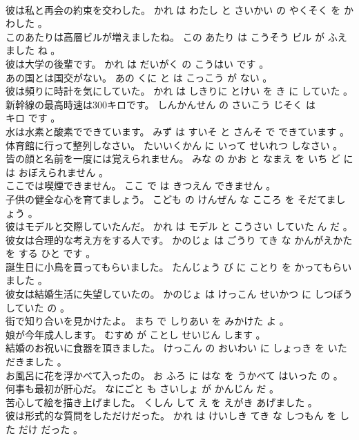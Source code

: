 \documentclass[8pt]{extreport}
\begin{document}
\begin{CJK}{UTF8}{min}
\\	彼は私と再会の約束を交わした。	かれ は わたし と さいかい の やくそく を かわした 。 
\\	このあたりは高層ビルが増えましたね。	この あたり は こうそう ビル が ふえました ね 。 
\\	彼は大学の後輩です。	かれ は だいがく の こうはい です 。 
\\	あの国とは国交がない。	あの くに と は こっこう が ない 。 
\\	彼は頻りに時計を気にしていた。	かれ は しきりに とけい を き に していた 。 
\\	新幹線の最高時速は300キロです。	しんかんせん の さいこう じそく は 
\\	キロ です 。 
\\	水は水素と酸素でできています。	みず は すいそ と さんそ で できています 。 
\\	体育館に行って整列しなさい。	たいいくかん に いって せいれつ しなさい 。 
\\	皆の顔と名前を一度には覚えられません。	みな の かお と なまえ を いち ど に は おぼえられません 。 
\\	ここでは喫煙できません。	ここ で は きつえん できません 。 
\\	子供の健全な心を育てましょう。	こども の けんぜん な こころ を そだてましょう 。 
\\	彼はモデルと交際していたんだ。	かれ は モデル と こうさい していた ん だ 。 
\\	彼女は合理的な考え方をする人です。	かのじょ は ごうり てき な かんがえかた を する ひと です 。 
\\	誕生日に小鳥を買ってもらいました。	たんじょう び に ことり を かってもらいました 。 
\\	彼女は結婚生活に失望していたの。	かのじょ は けっこん せいかつ に しつぼう していた の 。 
\\	街で知り合いを見かけたよ。	まち で しりあい を みかけた よ 。 
\\	娘が今年成人します。	むすめ が ことし せいじん します 。 
\\	結婚のお祝いに食器を頂きました。	けっこん の おいわい に しょっき を いただきました 。 
\\	お風呂に花を浮かべて入ったの。	お ふろ に はな を うかべて はいった の 。 
\\	何事も最初が肝心だ。	なにごと も さいしょ が かんじん だ 。 
\\	苦心して絵を描き上げました。	くしん して え を えがき あげました 。 
\\	彼は形式的な質問をしただけだった。	かれ は けいしき てき な しつもん を した だけ だった 。 

\end{CJK}
\end{document}
